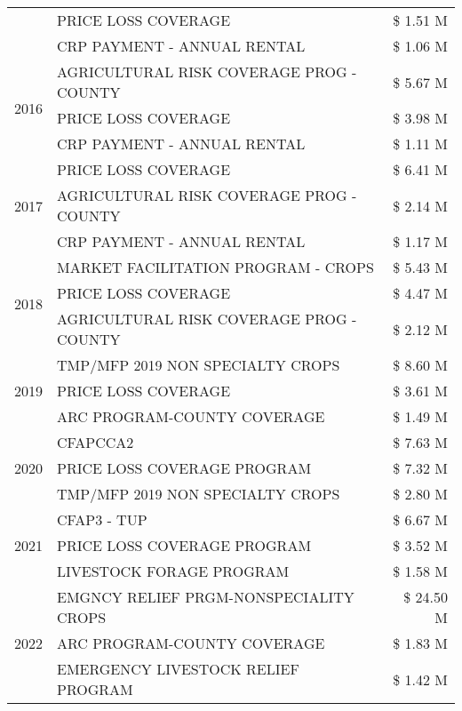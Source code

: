 \begin{tabular}{llr}
 & PRICE LOSS COVERAGE & \$ 1.51 M \\
 & CRP PAYMENT - ANNUAL RENTAL & \$ 1.06 M \\
\cline{1-3}
\multirow[t]{3}{*}{2016} & AGRICULTURAL RISK COVERAGE PROG - COUNTY & \$ 5.67 M \\
 & PRICE LOSS COVERAGE & \$ 3.98 M \\
 & CRP PAYMENT - ANNUAL RENTAL & \$ 1.11 M \\
\cline{1-3}
\multirow[t]{3}{*}{2017} & PRICE LOSS COVERAGE & \$ 6.41 M \\
 & AGRICULTURAL RISK COVERAGE PROG - COUNTY & \$ 2.14 M \\
 & CRP PAYMENT - ANNUAL RENTAL & \$ 1.17 M \\
\cline{1-3}
\multirow[t]{3}{*}{2018} & MARKET FACILITATION PROGRAM - CROPS & \$ 5.43 M \\
 & PRICE LOSS COVERAGE & \$ 4.47 M \\
 & AGRICULTURAL RISK COVERAGE PROG - COUNTY & \$ 2.12 M \\
\cline{1-3}
\multirow[t]{3}{*}{2019} & TMP/MFP 2019 NON SPECIALTY CROPS & \$ 8.60 M \\
 & PRICE LOSS COVERAGE & \$ 3.61 M \\
 & ARC PROGRAM-COUNTY COVERAGE & \$ 1.49 M \\
\cline{1-3}
\multirow[t]{3}{*}{2020} & CFAPCCA2 & \$ 7.63 M \\
 & PRICE LOSS COVERAGE PROGRAM & \$ 7.32 M \\
 & TMP/MFP 2019 NON SPECIALTY CROPS & \$ 2.80 M \\
\cline{1-3}
\multirow[t]{3}{*}{2021} & CFAP3 - TUP & \$ 6.67 M \\
 & PRICE LOSS COVERAGE PROGRAM & \$ 3.52 M \\
 & LIVESTOCK FORAGE PROGRAM & \$ 1.58 M \\
\cline{1-3}
\multirow[t]{3}{*}{2022} & EMGNCY RELIEF PRGM-NONSPECIALITY CROPS & \$ 24.50 M \\
 & ARC PROGRAM-COUNTY COVERAGE & \$ 1.83 M \\
 & EMERGENCY LIVESTOCK RELIEF PROGRAM & \$ 1.42 M \\
\cline{1-3}
\bottomrule
\end{tabular}
